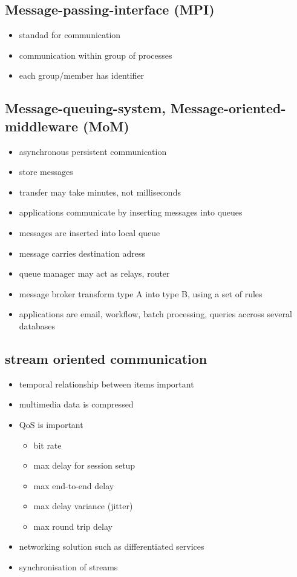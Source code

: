 \documentclass[ngerman,a4paper]{report}
\begin{document}
\subsection{Message-passing-interface (MPI)\\}
\begin{itemize}
	\item standad for communication
	\item communication within group of processes
	\item each group/member has identifier
\end{itemize}

\subsection{Message-queuing-system, Message-oriented-middleware (MoM)}

\begin{itemize}
	\item asynchronous persistent communication\\
	\item store messages
	\item transfer may take minutes, not milliseconds
	\item applications communicate by inserting messages into queues
	\item messages are inserted into local queue
	\item message carries destination adress
	\item queue manager may act as relays, router\\
	\item message broker transform type A into type B, using a set of rules
	\item applications are email, workflow, batch processing, queries accross several databases
\end{itemize}

\subsection{stream oriented communication}
\begin{itemize}
	\item temporal relationship between items important
	\item multimedia data is compressed
	\item QoS is important\\
		\begin{itemize}
			\item bit rate
			\item max delay for session setup
			\item max end-to-end delay
			\item max delay variance (jitter)
			\item max round trip delay\\
		\end{itemize}
	\item networking solution such as differentiated services
	\item synchronisation of streams
\end{itemize}
\end{document}
